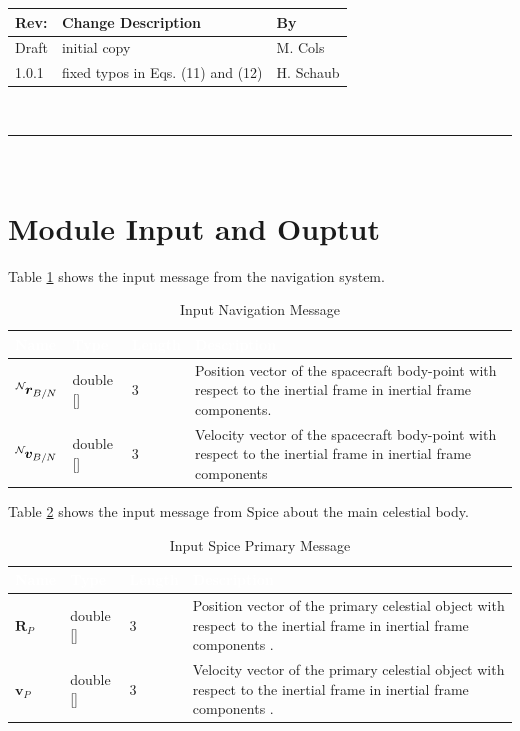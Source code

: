 \documentclass[]{AVSSimReportMemo}
\begin{document}
\makeCover


%
%
\pagestyle{empty}
{\renewcommand{\arraystretch}{2}
\noindent
\begin{longtable}{|p{0.5in}|p{4.5in}|p{1.14in}|}
\hline
{\bfseries Rev}: & {\bfseries Change Description} & {\bfseries By} \\
\hline
Draft & initial copy & M. Cols \\
1.0.1 & fixed typos in Eqs. (11) and (12) & H. Schaub \\
\hline

\end{longtable}
}

\newpage
\setcounter{page}{1}
\pagestyle{fancy}

\tableofcontents
~\\ \hrule ~\\

\newpage
\section{Module Input and Ouptut}
Table \ref{tab:inputNavTable} shows the input message from the navigation system.
\begin{table}[h!]
	\centering
	\caption{Input Navigation Message}
	\begin{tabular}{|l|l|l|p{3in}|}
		\hline
		\rowcolor{BrickRed}
		\textcolor{white}{Name} & \textcolor{white}{Type} &
		\textcolor{white}{Length} &
		\textcolor{white}{Description}  \\ \hline
		$\leftexp{N}{\bm{r}}_{B/N}$ & double [] & 3 &
		Position vector of the spacecraft body-point with respect to the inertial frame in inertial frame components. \\ \hline
		$\leftexp{N}{\bm{v}}_{B/N}$ & double [] & 3 &
		Velocity vector of the spacecraft body-point with respect to the inertial frame in inertial frame components \\ \hline
	\end{tabular}
	\label{tab:inputNavTable}
\end{table}


Table \ref{tab:inputCelTable} shows the input message from Spice about the main celestial body.
\begin{table}[h!]
	\centering
	\caption{Input Spice Primary Message}
	\begin{tabular}{|l|l|l|p{3in}|}
		\hline
		\rowcolor{BrickRed}
		\textcolor{white}{Name} & \textcolor{white}{Type} &
		\textcolor{white}{Length} &
		\textcolor{white}{Description}  \\ \hline
		$\bm{R}_P$  & double [] & 3 &
		Position vector of the primary celestial object with respect to the inertial frame in inertial frame components . \\ \hline
		$\bm{v}_P$  & double [] & 3 &
		Velocity vector of the primary celestial object with respect to the inertial frame in inertial frame components . \\ \hline
	\end{tabular}
	\label{tab:inputCelTable}
\end{table}
\end{document}
